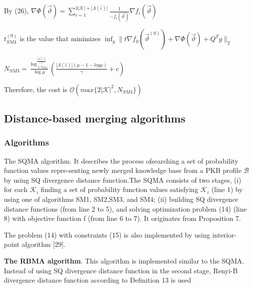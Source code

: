\documentclass[]{iosart2c}
\begin{document}
    By (26), $\nabla \Phi \left( \vec{\vartheta} \right) = \sum^{3|\mathcal{K}|+|\Lambda(\hat{\varepsilon})|}_{i=1} \frac{1}{-f_i\left(\vec{\vartheta}\right)} \nabla f_i \left( \vec{\vartheta} \right)$

    $t^{(0)}_{SM4}$ is the value that minimizes
    $\inf_g \parallel t\nabla f_0 \left( \vec{\vartheta}^(0) \right) + \nabla \Phi \left( \vec{\vartheta} \right) + Q^T g \parallel_2$

    $N_{SM3} = \frac{\log^{\frac{|\Lambda(\hat{\varepsilon})|}{(0)}}_{\in t_{SM4}}}{\log\mu} \left( \frac{ |\Lambda(\hat{\varepsilon})| (\mu - 1 - log\mu)}{\gamma} + c\right)$

    Therefore, the cost is $\mathcal{O}(max\{2 |\mathcal{K}|^2 ,N_{SM4}\})$

    \subsection{Distance-based merging algorithms}

    \subsubsection{Algorithms}

    The SQMA algorithm. It describes the process ofsearching a set of probability function values repre-senting newly merged knowledge base from a PKB
    profile $\mathcal{B}$ by using SQ divergence distance function.The SQMA consists of two stages, (i) for each $\mathcal{K}_i$
    finding a set of probability function values satisfying $\mathcal{K}_i$ (line 1) by using one of algorithms SM1, SM2,SM3, and SM4; (ii) building SQ divergence distance
    functions (from line 2 to 5), and solving optimization problem (14) (line 8) with objective function f (from line 6 to 7). It originates from Proposition 7.

    The problem (14) with constraints (15) is also
    implemented by using interior-point algorithm [29].

    \textbf{The RBMA algorithm}. This algorithm is implemented
    similar to the SQMA. Instead of using SQ
    divergence distance function in the second stage,
    Renyi-B divergence distance function according to
    Definition 13 is used
\end{document}
